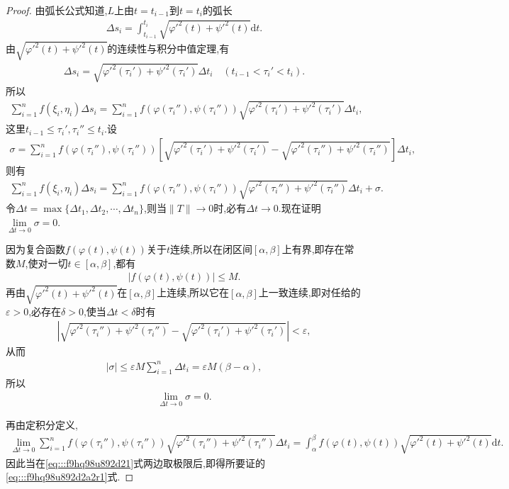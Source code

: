 \documentclass[../../main.tex]{subfiles}%
\begin{document}
\begin{proof}
由弧长公式知道,$L$上由$t=t_{i-1}$到$t=t_i$的弧长
\begin{align*}
\Delta s_i = \int_{t_{i-1}}^{t_i} \sqrt{\varphi'^2(t) + \psi'^2(t)} \mathrm{d}t.
\end{align*}
由$\sqrt{\varphi'^2(t)+\psi'^2(t)}$的连续性与积分中值定理,有
\begin{align*}
\Delta s_i = \sqrt{\varphi'^2(\tau_i') + \psi'^2(\tau_i')} \Delta t_i \quad (t_{i-1} < \tau_i' < t_i).
\end{align*}
所以
\begin{align*}
\sum_{i=1}^n f(\xi_i,\eta_i) \Delta s_i = \sum_{i=1}^n f(\varphi(\tau_i''),\psi(\tau_i'')) \sqrt{\varphi'^2(\tau_i') + \psi'^2(\tau_i')} \Delta t_i,
\end{align*}
这里$t_{i-1} \leqslant \tau_i',\tau_i'' \leqslant t_i$.设
\begin{align*}
\sigma = \sum_{i=1}^n f(\varphi(\tau_i''),\psi(\tau_i'')) \left[ \sqrt{\varphi'^2(\tau_i') + \psi'^2(\tau_i')} - \sqrt{\varphi'^2(\tau_i'') + \psi'^2(\tau_i'')} \right] \Delta t_i,
\end{align*}
则有
\begin{align}
\sum_{i=1}^n f(\xi_i,\eta_i) \Delta s_i = \sum_{i=1}^n f(\varphi(\tau_i''),\psi(\tau_i'')) \sqrt{\varphi'^2(\tau_i'') + \psi'^2(\tau_i'')} \Delta t_i + \sigma. \label{eq:::f9hq98u892d21}
\end{align}
令$\Delta t = \max\{ \Delta t_1,\Delta t_2,\cdots,\Delta t_n \}$,则当$\| T \| \to 0$时,必有$\Delta t \to 0$.现在证明$\lim\limits_{\Delta t \to 0} \sigma = 0$.

因为复合函数$f(\varphi(t),\psi(t))$关于$t$连续,所以在闭区间$[\alpha,\beta]$上有界,即存在常数$M$,使对一切$t \in [\alpha,\beta]$,都有
\begin{align*}
|f(\varphi(t),\psi(t))| \leqslant M.
\end{align*}
再由$\sqrt{\varphi'^2(t)+\psi'^2(t)}$在$[\alpha,\beta]$上连续,所以它在$[\alpha,\beta]$上一致连续,即对任给的$\varepsilon > 0$,必存在$\delta > 0$,使当$\Delta t < \delta$时有
\begin{align*}
\left| \sqrt{\varphi'^2(\tau_i'') + \psi'^2(\tau_i'')} - \sqrt{\varphi'^2(\tau_i') + \psi'^2(\tau_i')} \right| < \varepsilon,
\end{align*}
从而
\begin{align*}
|\sigma| \leqslant \varepsilon M \sum_{i=1}^n \Delta t_i = \varepsilon M (\beta - \alpha),
\end{align*}
所以
\begin{align*}
\lim_{\Delta t \to 0} \sigma = 0.
\end{align*}

再由定积分定义,
\begin{align*}
\lim_{\Delta t \to 0} \sum_{i=1}^n f(\varphi(\tau_i''),\psi(\tau_i'')) \sqrt{\varphi'^2(\tau_i'') + \psi'^2(\tau_i'')} \Delta t_i
= \int_{\alpha}^{\beta} f(\varphi(t),\psi(t)) \sqrt{\varphi'^2(t) + \psi'^2(t)} \mathrm{d}t.
\end{align*}
因此当在\eqref{eq:::f9hq98u892d21}式两边取极限后,即得所要证的\eqref{eq:::f9hq98u892d2a2r1}式.
\end{proof}
\end{document}
